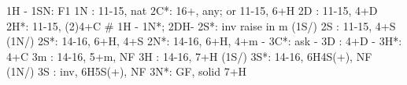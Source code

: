1H - 1SN: F1
1N : 11-15, nat
2C*: 16+, any; or 11-15, 6+H
2D : 11-15, 4+D
2H*: 11-15, (2)4+C
# 1H - 1N*; 2DH- 2S*: inv raise in m
(1S/) 2S : 11-15, 4+S
(1N/) 2S*: 14-16, 6+H, 4+S
2N*: 14-16, 6+H, 4+m
   - 3C*: ask
        - 3D : 4+D
        - 3H*: 4+C
3m : 14-16, 5+m, NF
3H : 14-16, 7+H
(1S/) 3S*: 14-16, 6H4S(+), NF
(1N/) 3S : inv, 6H5S(+), NF
3N*: GF, solid 7+H